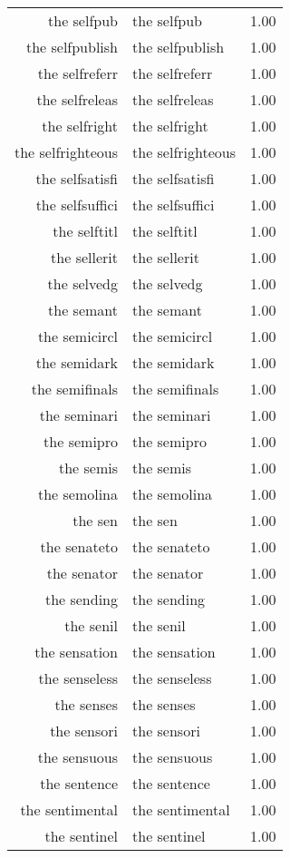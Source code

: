 \begin{table}[ht]
\begin{tabular}{rlr}
  the selfpub & the selfpub & 1.00 \\ 
  the selfpublish & the selfpublish & 1.00 \\ 
  the selfreferr & the selfreferr & 1.00 \\ 
  the selfreleas & the selfreleas & 1.00 \\ 
  the selfright & the selfright & 1.00 \\ 
  the selfrighteous & the selfrighteous & 1.00 \\ 
  the selfsatisfi & the selfsatisfi & 1.00 \\ 
  the selfsuffici & the selfsuffici & 1.00 \\ 
  the selftitl & the selftitl & 1.00 \\ 
  the sellerit & the sellerit & 1.00 \\ 
  the selvedg & the selvedg & 1.00 \\ 
  the semant & the semant & 1.00 \\ 
  the semicircl & the semicircl & 1.00 \\ 
  the semidark & the semidark & 1.00 \\ 
  the semifinals & the semifinals & 1.00 \\ 
  the seminari & the seminari & 1.00 \\ 
  the semipro & the semipro & 1.00 \\ 
  the semis & the semis & 1.00 \\ 
  the semolina & the semolina & 1.00 \\ 
  the sen & the sen & 1.00 \\ 
  the senateto & the senateto & 1.00 \\ 
  the senator & the senator & 1.00 \\ 
  the sending & the sending & 1.00 \\ 
  the senil & the senil & 1.00 \\ 
  the sensation & the sensation & 1.00 \\ 
  the senseless & the senseless & 1.00 \\ 
  the senses & the senses & 1.00 \\ 
  the sensori & the sensori & 1.00 \\ 
  the sensuous & the sensuous & 1.00 \\ 
  the sentence & the sentence & 1.00 \\ 
  the sentimental & the sentimental & 1.00 \\ 
  the sentinel & the sentinel & 1.00 \\ 

\end{tabular}
\end{table}
